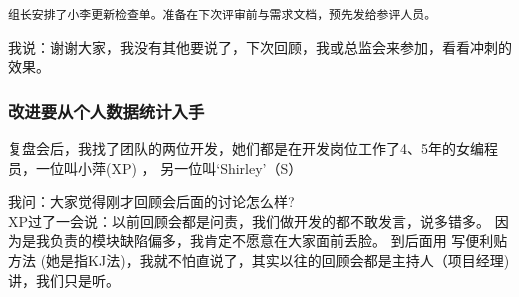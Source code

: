 \texttt{组长安排了小李更新检查单。准备在下次评审前与需求文档，预先发给参评人员。}

我说：谢谢大家，我没有其他要说了，下次回顾，我或总监会来参加，看看冲刺的效果。


\hypertarget{ux6539ux8fdbux8981ux4eceux4e2aux4ebaux6570ux636eux7edfux8ba1ux5165ux624b}{%
\subsubsection{改进要从个人数据统计入手}\label{ux6539ux8fdbux8981ux4eceux4e2aux4ebaux6570ux636eux7edfux8ba1ux5165ux624b}}

复盘会后，我找了团队的两位开发，她们都是在开发岗位工作了4、5年的女编程员，一位叫小萍(XP)
， 另一位叫`Shirley'（S）

我问：大家觉得刚才回顾会后面的讨论怎么样?\\
XP过了一会说：以前回顾会都是问责，我们做开发的都不敢发言，说多错多。
因为是我负责的模块缺陷偏多，我肯定不愿意在大家面前丢脸。 到后面用
写便利贴方法
(她是指KJ法)，我就不怕直说了，其实以往的回顾会都是主持人（项目经理)
讲，我们只是听。

